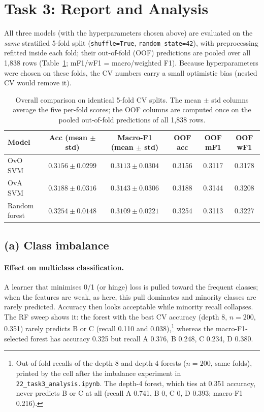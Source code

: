 \documentclass[11pt]{article}
\begin{document}
\section{Task 3: Report and Analysis}
All three models (with the hyperparameters chosen above) are evaluated on the \emph{same}
stratified 5-fold split (\texttt{shuffle=True}, \texttt{random\_state=42}), with preprocessing refitted inside each
fold; their out-of-fold (OOF) predictions are pooled over all 1{,}838 rows (Table~\ref{tab:overall}; mF1/wF1 = macro/weighted F1).
Because hyperparameters were chosen on these folds, the CV numbers carry a small optimistic bias (nested
CV would remove it).

\begin{table}[H]\centering\small
\caption{Overall comparison on identical 5-fold CV splits. The mean $\pm$ std columns average the five per-fold scores; the OOF columns are computed once on the pooled out-of-fold predictions of all 1{,}838 rows.}\label{tab:overall}
\setlength{\tabcolsep}{4pt}
\begin{tabular}{@{}lccccc@{}}
\toprule
Model & Acc (mean $\pm$ std) & Macro-F1 (mean $\pm$ std) & OOF acc & OOF mF1 & OOF wF1 \\
\midrule
OvO SVM & $0.3156\pm0.0299$ & $0.3113\pm0.0304$ & 0.3156 & 0.3117 & 0.3178 \\
OvA SVM & $0.3188\pm0.0316$ & $0.3143\pm0.0306$ & 0.3188 & 0.3144 & 0.3208 \\
Random forest & $0.3254\pm0.0148$ & $0.3109\pm0.0221$ & 0.3254 & 0.3113 & 0.3227 \\
\bottomrule
\end{tabular}
\end{table}

\subsection{(a) Class imbalance}\label{sec:t3a}
\paragraph{Effect on multiclass classification.} A learner that minimises 0/1 (or hinge) loss is pulled
toward the frequent classes; when the features are weak, as here, this pull dominates and minority
classes are rarely predicted. Accuracy then looks acceptable while minority recall collapses. The RF
sweep shows it: the forest with the best CV accuracy (depth 8, $n=200$, 0.351) rarely predicts B or C
(recall 0.110 and 0.038),\footnote{Out-of-fold recalls of the depth-8 and depth-4 forests ($n=200$, same
folds), printed by the cell after the imbalance experiment in \texttt{22\_task3\_analysis.ipynb}. The depth-4 forest, which ties at 0.351
accuracy, never predicts B or C at all (recall A 0.741, B 0, C 0, D 0.393; macro-F1 0.216).} whereas the macro-F1-selected forest has accuracy 0.325 but recall A 0.376,
B 0.248, C 0.234, D 0.380.
\end{document}
